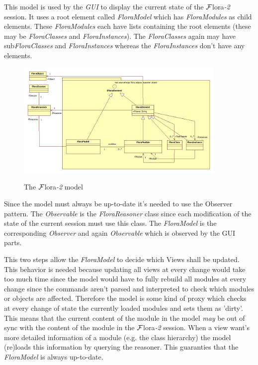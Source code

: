 \documentclass[a4paper,11pt]{article}
\newcommand{\FLORA}{{\mbox{\sc ${\cal F}${lora}\rm\emph{-2}}}\xspace}
\begin{document}
This model is used by the \emph{GUI} to display the current state of the \FLORA
session. It uses a root element called \emph{FloraModel} which has \emph{FloraModules}
as child elements. These \emph{FloraModules} each have lists containing the root
elements (these may be \emph{FloraClasses} and \emph{FloraInstances}). The
\emph{FloraClasses} again may have sub\emph{FloraClasses} and \emph{FloraInstances}
whereas the \emph{FloraInstances} don't have any elements.

\begin{figure}
  \includegraphics[width=0.9\textwidth]{FloraModel}\\
  \caption{The \FLORA model}\label{figure:floramodel}
\end{figure}

Since the model must always be up-to-date it's needed to use the Observer
pattern. The \emph{Observable} is the \emph{FloraReasoner} class since each
modification of the state of the current session must use this class. The
\emph{FloraModel} is the corresponding \emph{Observer} and again
\emph{Observable} which is observed by the GUI parts.

This two steps allow the \emph{FloraModel} to decide which Views shall
be updated. This behavior is needed because updating all views at every change
would take too much time since the model would have to fully rebuild all
modules at every change since the commands aren't parsed and interpreted
to check which modules or objects are affected.
Therefore the model is some kind of proxy which checks at every change of state
the currently loaded modules and sets them as 'dirty'. This means that the
current content of the module in the model \emph{may} be out of sync with the content
of the module in the \FLORA session.
When a view want's more detailed information
of a module (e.g. the class hierarchy) the model (re)loads this information
by querying the reasoner. This guaranties that the \emph{FloraModel} is
always up-to-date.
\end{document}

